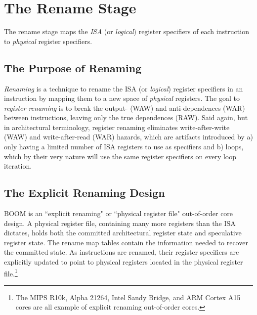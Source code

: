 \chapter{The Rename Stage}

The rename stage maps the {\em ISA} (or {\em logical}) register specifiers of each instruction to {\em physical} register specifiers. 


\section{The Purpose of Renaming}

{\em Renaming} is a technique to rename the ISA (or {\em logical}) register specifiers in an instruction by mapping them to a new space of {\em physical} registers.  The goal to {\em register renaming} is to break the output- (WAW) and anti-dependences (WAR) between instructions, leaving only the true dependences (RAW).  Said again, but in architectural terminology, register renaming eliminates write-after-write (WAW) and write-after-read (WAR) hazards, which are artifacts introduced by a) only having a limited number of ISA registers to use as specifiers and b) loops, which by their very nature will use the same register specifiers on every loop iteration. 

\section{The Explicit Renaming Design}

BOOM is an ``explicit renaming" or ``physical register file" out-of-order core design.  A physical register file, containing many more registers than the ISA dictates, holds both the committed architectural register state and speculative register state. The rename map tables contain the information needed to recover the committed state. As instructions are renamed, their register specifiers are explicitly updated to point to physical registers located in the physical register file.\footnote{The MIPS R10k\cite{mipsr10k}, Alpha 21264\cite{alpha21264}, Intel Sandy Bridge, and ARM Cortex A15 cores are all example of explicit renaming out-of-order cores.}


